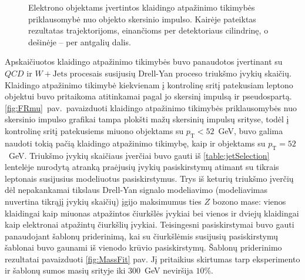 \documentclass[a4paper, 12pt, oneside]{article}
\newcommand{\pT}{p_{\mathrm{T}}}
\newcommand{\WJets}{W\! +\!\mathrm{Jets}}
\newcommand{\QCD}{QC\! D}
\begin{document}
\begin{figure}[t!]
	\caption{\label{fig:FRe}
		Elektrono objektams įvertintos klaidingo atpažinimo tikimybės priklausomybė nuo objekto skersinio impulso.
		Kairėje pateiktas rezultatas trajektorijoms, einančioms per detektoriaus cilindrinę, o dešinėje -- per antgalių dalis.}
\end{figure}

Apskaičiuotos klaidingo atpažinimo tikimybės buvo panaudotos įvertinant su $\QCD$ ir $\WJets$ procesais susijusių Drell-Yan
proceso triukšmo įvykių skaičių.
Klaidingo atpažinimo tikimybė kiekvienam į kontrolinę sritį patekusiam leptono objektui buvo pritaikoma atitinkamai pagal
jo skersinį impulsą ir pseudospartą.
\ref{fig:FRmu}~pav.\ pavaizduoti klaidingo atpažinimo tikimybės priklausomybės nuo skersinio impulso grafikai tampa
plokšti mažų skersinių impulsų srityse, todėl į kontrolinę sritį patekusiems miuono objektams su $\pT\!<\!52$~GeV, buvo galima
naudoti tokią pačią klaidingo atpažinimo tikimybę, kaip ir objektams su $\pT\!=\!52$~GeV.
Triukšmo įvykių skaičiaus įverčiai buvo gauti iš \ref{table:jetSelection} lentelėje nurodytą atranką praėjusių įvykių
pasiskirstymų atimant su tikrais leptonais susijusius modeliuotus pasiskirstymus.
Trys iš keturių triukšmo įverčių dėl nepakankamai tikslaus Drell-Yan signalo modeliavimo (modeliavimas nuvertina tikrąjį
įvykių skaičių) įgijo maksimumus ties $Z$ bozono mase: vienos klaidingai kaip miuonas atpažintos čiurkšlės įvykiai bei
vienos ir dviejų klaidingai kaip elektronai atpažintų čiurkšlių įvykiai.
Teisingesni pasiskirstymai buvo gauti panaudojant šablonų priderinimą, kai su čiurkšlėmis susijusių pasiskirstymų šablonai
buvo gaunami iš vienodo krūvio pasiskirstymų.
Šablonų priderinimo rezultatai pavaizduoti \ref{fig:MassFit} pav.
Jį pritaikius skirtumas tarp eksperimento ir šablonų sumos masių srityje iki $300$~GeV neviršija $10\%$.
\end{document}
